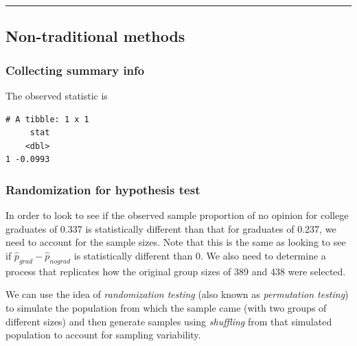\documentclass[12pt,]{krantz}
\makeatletter
\newenvironment{Shaded}{\begin{snugshade}}{\end{snugshade}}
\newcommand{\KeywordTok}[1]{\textcolor[rgb]{0.27,0.27,0.27}{\textbf{#1}}}
\newcommand{\DataTypeTok}[1]{\textcolor[rgb]{0.27,0.27,0.27}{#1}}
\newcommand{\StringTok}[1]{\textcolor[rgb]{0.5,0.5,0.5}{#1}}
\newcommand{\OperatorTok}[1]{\textcolor[rgb]{0.43,0.43,0.43}{\textbf{#1}}}
\newcommand{\NormalTok}[1]{#1}
\newenvironment{kframe}{%
\medskip{}
\setlength{\fboxsep}{.8em}
 \def\at@end@of@kframe{}%
 \ifinner\ifhmode%
  \def\at@end@of@kframe{\end{minipage}}%
  \begin{minipage}{\columnwidth}%
 \fi\fi%
 \def\FrameCommand##1{\hskip\@totalleftmargin \hskip-\fboxsep
 \colorbox{shadecolor}{##1}\hskip-\fboxsep
     \hskip-\linewidth \hskip-\@totalleftmargin \hskip\columnwidth}%
 \MakeFramed {\advance\hsize-\width
   \@totalleftmargin\z@ \linewidth\hsize
   \@setminipage}}%
 {\par\unskip\endMakeFramed%
 \at@end@of@kframe}
\renewenvironment{Shaded}{\begin{kframe}}{\end{kframe}}
\makeatother
\begin{document}
\begin{center}\rule{0.5\linewidth}{\linethickness}\end{center}

\subsection{Non-traditional methods}\label{non-traditional-methods-2}

\subsubsection*{Collecting summary info}\label{collecting-summary-info}


The observed statistic is

\begin{Shaded}
\end{Shaded}

\begin{verbatim}
# A tibble: 1 x 1
     stat
    <dbl>
1 -0.0993
\end{verbatim}

\subsubsection*{Randomization for hypothesis
test}\label{randomization-for-hypothesis-test}


In order to look to see if the observed sample proportion of no opinion
for college graduates of 0.337 is statistically different than that for
graduates of 0.237, we need to account for the sample sizes. Note that
this is the same as looking to see if
\(\hat{p}_{grad} - \hat{p}_{nograd}\) is statistically different than 0.
We also need to determine a process that replicates how the original
group sizes of 389 and 438 were selected.

We can use the idea of \emph{randomization testing} (also known as
\emph{permutation testing}) to simulate the population from which the
sample came (with two groups of different sizes) and then generate
samples using \emph{shuffling} from that simulated population to account
for sampling variability.
\end{document}
